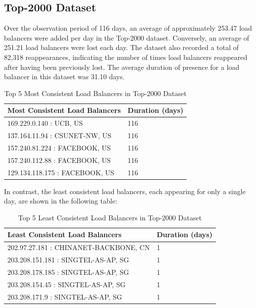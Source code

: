\documentclass[12pt]{cwru_thesis}
\begin{document}
\subsection{Top-2000 Dataset}

Over the observation period of 116 days, an average of approximately 253.47 load balancers were added per day in the Top-2000 dataset. Conversely, an average of 251.21 load balancers were lost each day. The dataset also recorded a total of 82,318 reappearances, indicating the number of times load balancers reappeared after having been previously lost. The average duration of presence for a load balancer in this dataset was 31.10 days.

\begin{table}[h!]
    \centering
    \begin{tabular}{|l|l|}
        \hline
        \textbf{Most Consistent Load Balancers} & \textbf{Duration (days)} \\ \hline
        169.229.0.140 : UCB, US & 116 \\ \hline
        137.164.11.94 : CSUNET-NW, US & 116 \\ \hline
        157.240.81.224 : FACEBOOK, US & 116 \\ \hline
        157.240.112.88 : FACEBOOK, US & 116 \\ \hline
        129.134.118.175 : FACEBOOK, US & 116 \\ \hline
    \end{tabular}
    \caption{Top 5 Most Consistent Load Balancers in Top-2000 Dataset}
\end{table}

In contrast, the least consistent load balancers, each appearing for only a single day, are shown in the following table:

\begin{table}[h!]
    \centering
    \begin{tabular}{|l|l|}
        \hline
        \textbf{Least Consistent Load Balancers} & \textbf{Duration (days)} \\ \hline
        202.97.27.181 : CHINANET-BACKBONE, CN & 1 \\ \hline
        203.208.151.181 : SINGTEL-AS-AP, SG & 1 \\ \hline
        203.208.178.185 : SINGTEL-AS-AP, SG & 1 \\ \hline
        203.208.154.45 : SINGTEL-AS-AP, SG & 1 \\ \hline
        203.208.171.9 : SINGTEL-AS-AP, SG & 1 \\ \hline
    \end{tabular}
    \caption{Top 5 Least Consistent Load Balancers in Top-2000 Dataset}
\end{table}
\end{document}
